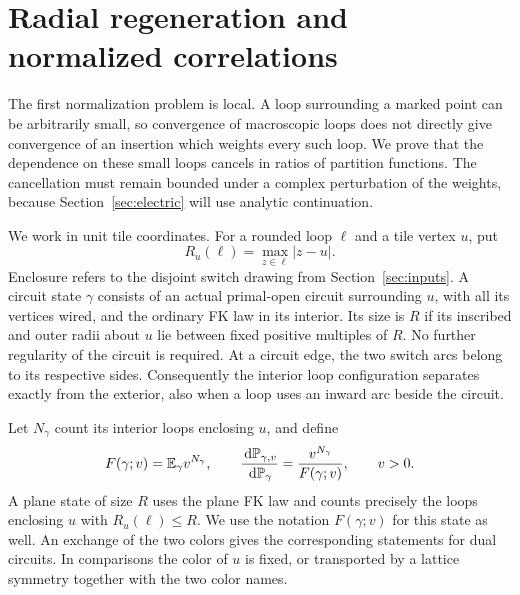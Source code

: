 \section{Radial regeneration and normalized correlations}\label{sec:radial}

The first normalization problem is local. A loop surrounding a marked
point can be arbitrarily small, so convergence of macroscopic loops does
not directly give convergence of an insertion which weights every such
loop. We prove that the dependence on these small loops cancels in ratios
of partition functions. The cancellation must remain bounded under a
complex perturbation of the weights, because Section~\ref{sec:electric}
will use analytic continuation.

We work in unit tile coordinates. For a rounded loop $\ell$ and a tile
vertex $u$, put
\[
 R_u(\ell)=\max_{z\in\ell}|z-u|.
\]
Enclosure refers to the disjoint switch drawing from
Section~\ref{sec:inputs}. A circuit state $\gamma$ consists of an actual
primal-open circuit surrounding $u$, with all its vertices wired, and
the ordinary FK law in its interior. Its size is $R$ if its inscribed
and outer radii about $u$ lie between fixed positive multiples of $R$.
No further regularity of the circuit is required. At a circuit edge,
the two switch arcs belong to its respective sides. Consequently the
interior loop configuration separates exactly from the exterior, also
when a loop uses an inward arc beside the circuit.

Let $N_\gamma$ count its interior loops enclosing $u$, and define
\begin{equation}\label{eq:radial-partition}
 F(\gamma;v)=\mathbb E_\gamma v^{N_\gamma},
 \qquad
 \frac{\,\mathrm d\mathbb P_{\gamma,v}}{\,\mathrm d\mathbb P_\gamma}
       =\frac{v^{N_\gamma}}{F(\gamma;v)},\qquad v>0.
\end{equation}
A plane state of size $R$ uses the plane FK law and counts precisely
the loops enclosing $u$ with $R_u(\ell)\le R$. We use the notation
$F(\gamma;v)$ for this state as well. An exchange of the two colors
gives the corresponding statements for dual circuits. In comparisons
the color of $u$ is fixed, or transported by a lattice symmetry together
with the two color names.


